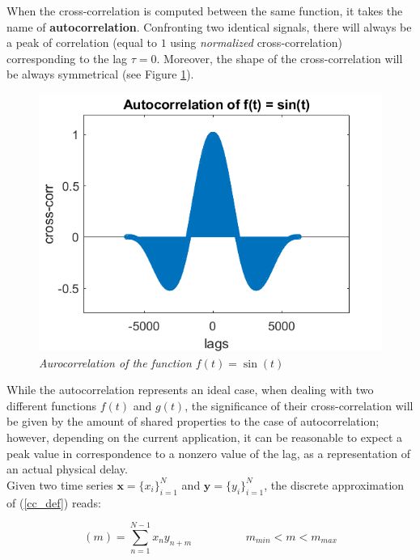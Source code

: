 \documentclass[12pt, a4paper]{report}
\begin{document}
When the cross-correlation is computed between the same function, it takes the name of \textbf{autocorrelation}. Confronting two identical signals, there will always be a peak of correlation (equal to $1$ using \textit{normalized} cross-correlation) corresponding to the lag $\tau = 0$. Moreover, the shape of the cross-correlation will be always symmetrical (see Figure \ref{autocorr}).

\begin{figure}[H]
	\begin{center}
		\includegraphics[scale=.75]{autocorr.png} 
	\end{center} 
	\caption{\textit{Aurocorrelation of the function $ f(t) = \sin(t) $}} \label{autocorr}
	
\end{figure}


While the autocorrelation represents an ideal case, when dealing with two different functions $f(t)$ and $g(t)$, the significance of their cross-correlation will be given by the amount of shared properties to the case of autocorrelation; however, depending on the current application, it can be reasonable to expect a peak value in correspondence to a nonzero value of the lag, as a representation of an actual physical delay.
\\

Given two time series $ \textbf{x} = \{x_i\}_{i=1}^N$ and  $\textbf{y} = \{y_i\}_{i=1}^N$, the discrete approximation of (\ref{cc_def}) reads:


\begin{equation}
	[\textbf{x} \star \textbf{y}] (m) =  \sum_{n=1}^{N-1} x_n y_{n+m} \hspace{2cm} m_{min} < m < m_{max}
\end{equation}  
\end{document}
